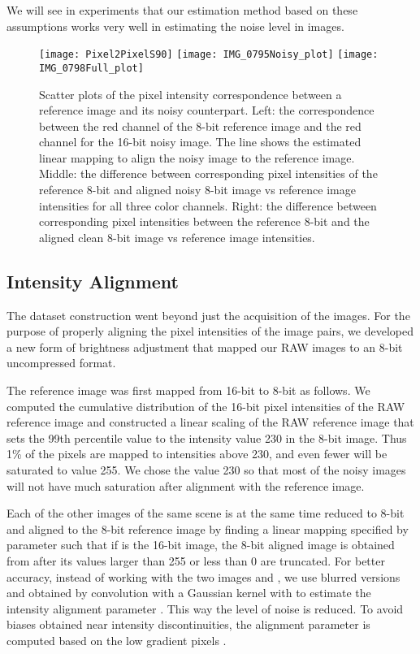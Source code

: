 \documentclass[review]{elsarticle}
\begin{document}
 We will see in experiments that our estimation method based on these assumptions works very well in estimating the noise level in images.
\begin{figure*}[t]
\centering
\hskip -1mm
\texttt{[image: Pixel2PixelS90]}
\hskip -1mm
\texttt{[image: IMG\_0795Noisy\_plot]}
\hskip -1mm
\texttt{[image: IMG\_0798Full\_plot]}
\vskip -3mm
\caption{Scatter plots of the pixel intensity correspondence between a reference image and its noisy counterpart. Left: the correspondence between the red channel of the 8-bit reference image and the red channel for the 16-bit noisy image. The line shows the estimated linear mapping to align the noisy image to the reference image. Middle: the difference between corresponding pixel intensities of the reference 8-bit and aligned noisy 8-bit image vs reference image intensities for all three color channels. Right: the difference between corresponding pixel intensities between the reference 8-bit and the aligned clean 8-bit image vs reference image intensities. }
\label{fig:pixelcorrespondence}
\vspace{-4mm}
\end{figure*}
\subsection{Intensity Alignment} \label{sec:alignment}


The dataset construction went beyond just the acquisition of the images. For the purpose of properly aligning the pixel intensities of the image pairs, we developed a new form of brightness adjustment that mapped our RAW images to an 8-bit uncompressed format. 

The reference image was first mapped from 16-bit to 8-bit as follows. We computed the cumulative distribution of the 16-bit pixel intensities of the RAW reference image and constructed a linear scaling of the RAW reference image that sets the 99th percentile value to the intensity value 230 in the 8-bit image. Thus 1\% of the pixels are mapped to intensities above 230, and even fewer will be saturated to value 255. We chose the value 230 so that most of the noisy images will not have much saturation after alignment with the reference image.



Each of the other images of the same scene is at the same time reduced to 8-bit and aligned to the 8-bit reference image by finding a linear mapping specified by parameter  such that if  is the 16-bit image, the 8-bit aligned image is obtained from  after its values larger than 255 or less than 0 are truncated. For better accuracy,  instead of working with the two images  and , we use blurred versions  and  obtained by convolution with a Gaussian kernel with  to estimate the intensity alignment parameter . This way the level of noise is reduced. To avoid biases obtained near intensity discontinuities, the alignment parameter is computed based on the low gradient pixels .
\end{document}
